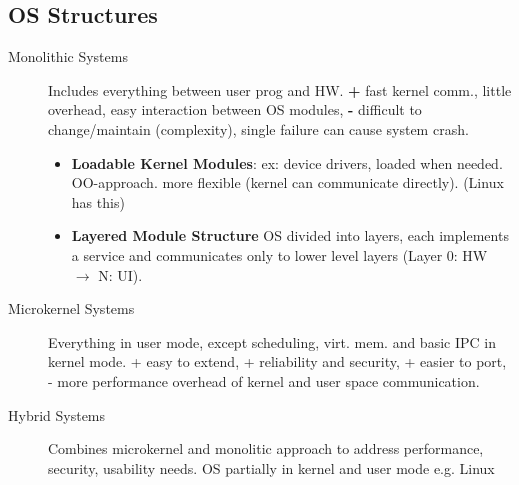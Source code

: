 \subsection*{OS Structures}
\begin{description}
    \item[Monolithic Systems]Includes everything between user prog and HW. \textbf{+} fast kernel comm., little overhead, easy interaction between OS modules, \textbf{-} difficult to change/maintain (complexity), single failure can cause system crash.
\begin{itemize}
    \item \textbf{Loadable Kernel Modules}: ex: device drivers, loaded when needed. OO-approach. more flexible (kernel can communicate directly). (Linux has this) \\
    \item \textbf{Layered Module Structure} OS divided into layers, each implements a service and communicates only to lower level layers (Layer 0: HW $\rightarrow$ N: UI).
\end{itemize}
    \item[Microkernel Systems] Everything in user mode, except scheduling, virt. mem. and basic IPC in kernel mode. + easy to extend, + reliability and security, + easier to port, - more performance overhead of kernel and user space communication. %
      \item[Hybrid Systems] Combines microkernel and monolitic approach to address performance, security, usability needs. OS partially in kernel and user mode e.g. Linux
\end{description}
